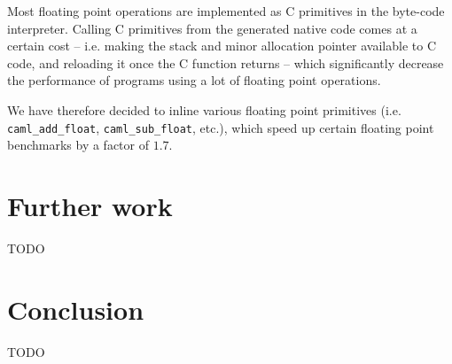 \documentclass[a4paper]{acm_proc_article-sp}
\begin{document}
Most floating point operations are implemented as C primitives in the byte-code
interpreter. Calling C primitives from the generated native code comes at a
certain cost -- i.e. making the stack and minor allocation pointer available
to C code, and reloading it once the C function returns -- which significantly
decrease the performance of programs using a lot of floating point operations.

We have therefore decided to inline various floating point primitives (i.e.
\texttt{caml\_add\_float}, \texttt{caml\_sub\_float}, etc.), which
speed up certain floating point benchmarks by a factor of $1.7$.


\section{Further work}

TODO


\section{Conclusion}

TODO




\end{document}
